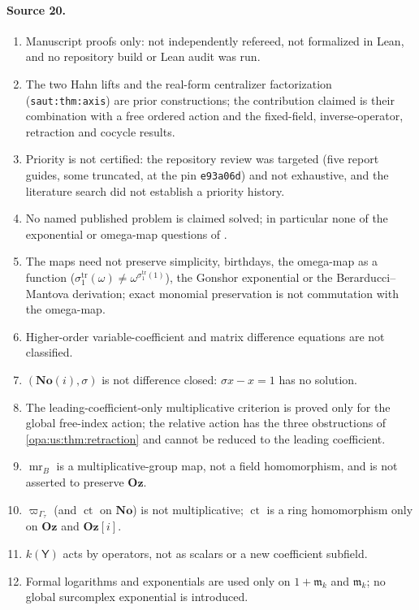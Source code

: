 \documentclass[11pt,oneside]{article}
\numberwithin{equation}{section}
\theoremstyle{definition}
\theoremstyle{remark}
\newcommand{\No}{\mathbf{No}}
\newcommand{\Oz}{\mathbf{Oz}}
\newcommand{\Og}{\mathbf{Oz}[i]}
\newcommand{\SC}{\mathbf{No}(i)}
\newcommand{\mm}{\mathfrak m}
\newcommand{\ct}{\operatorname{ct}}
\newcommand{\lbl}[1]{\nolinkurl{#1}}
\begin{document}
\paragraph{Source 20.}
\begin{enumerate}[itemsep=1pt]
\item Manuscript proofs only: not independently refereed, not formalized in Lean, and no repository build or Lean audit was run.
\item The two Hahn lifts \cite{KKS,KSgroups} and the real-form centralizer factorization (\lbl{saut:thm:axis}) are prior constructions; the
contribution claimed is their combination with a free ordered action and the fixed-field, inverse-operator, retraction and cocycle results.
\item Priority is not certified: the repository review was targeted (five report guides, some truncated, at the pin \texttt{e93a06d}) and not
exhaustive, and the literature search did not establish a priority history.
\item No named published problem is claimed solved; in particular none of the exponential or omega-map questions of \cite[Section~5]{KKS}.
\item The maps need not preserve simplicity, birthdays, the omega-map as a function ($\sigma^{\mathrm{tr}}_1(\omega)\ne\omega^{\sigma^{\mathrm{tr}}_1(1)}$),
the Gonshor exponential or the Berarducci--Mantova derivation; exact monomial preservation is not commutation with the omega-map.
\item Higher-order variable-coefficient and matrix difference equations are not classified.
\item $(\SC,\sigma)$ is not difference closed: $\sigma x-x=1$ has no solution.
\item The leading-coefficient-only multiplicative criterion is proved only for the global free-index action; the relative action has the three
obstructions of \cref{opa:us:thm:retraction} and cannot be reduced to the leading coefficient.
\item $\operatorname{mr}_B$ is a multiplicative-group map, not a field homomorphism, and is not asserted to preserve $\Oz$.
\item $\varpi_{\Gamma_\tau}$ (and $\ct$ on $\No$) is not multiplicative; $\ct$ is a ring homomorphism only on $\Oz$ and $\Og$.
\item $k(\mathsf Y)$ acts by operators, not as scalars or a new coefficient subfield.
\item Formal logarithms and exponentials are used only on $1+\mm_k$ and $\mm_k$; no global surcomplex exponential is introduced.

\end{enumerate}
\end{document}
